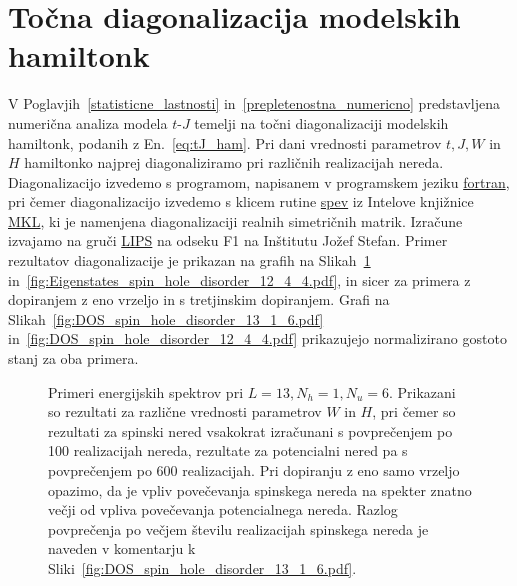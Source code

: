 \section{Točna diagonalizacija modelskih hamiltonk}
\label{diagonalizacija_metoda}
V Poglavjih~\ref{statisticne_lastnosti} in~\ref{prepletenostna_numericno} predstavljena numerična analiza modela $t$-$J$ temelji na točni diagonalizaciji modelskih hamiltonk, podanih z En.~\eqref{eq:tJ_ham}. Pri dani vrednosti parametrov $t, J, W$ in $H$ hamiltonko najprej diagonaliziramo pri različnih realizacijah nereda. Diagonalizacijo izvedemo s programom, napisanem v programskem jeziku \url{fortran}, pri čemer diagonalizacijo izvedemo s klicem rutine \url{spev} iz Intelove knjižnice \url{MKL}, ki je namenjena diagonalizaciji realnih simetričnih matrik. Izračune izvajamo na gruči \url{LIPS} na odseku F1 na Inštitutu Jožef Stefan. Primer rezultatov diagonalizacije je prikazan na grafih na Slikah~\ref{fig:Eigenstates_spin_hole_disorder_13_1_6.pdf} in~\ref{fig:Eigenstates_spin_hole_disorder_12_4_4.pdf}, in sicer za primera z dopiranjem z eno vrzeljo in s tretjinskim dopiranjem. Grafi na Slikah~\ref{fig:DOS_spin_hole_disorder_13_1_6.pdf} in~\ref{fig:DOS_spin_hole_disorder_12_4_4.pdf} prikazujejo normalizirano gostoto stanj za oba primera.
\vspace{3cm} 	
 \begin{figure}[H]
\caption{Primeri energijskih spektrov pri $L=13, N_h=1, N_u=6.$ Prikazani so rezultati za različne vrednosti parametrov $W$ in $H$, pri čemer so rezultati za spinski nered vsakokrat izračunani s povprečenjem po 100 realizacijah nereda, rezultate za potencialni nered pa s povprečenjem po 600 realizacijah. Pri dopiranju z eno samo vrzeljo opazimo, da je vpliv povečevanja spinskega nereda na spekter znatno večji od vpliva povečevanja potencialnega nereda. Razlog povprečenja po večjem številu realizacijah spinskega nereda je naveden v komentarju k Sliki~\ref{fig:DOS_spin_hole_disorder_13_1_6.pdf}.  }
\label{fig:Eigenstates_spin_hole_disorder_13_1_6.pdf}
\end{figure}
